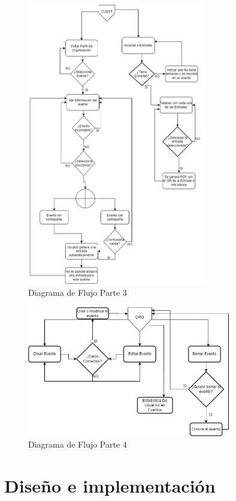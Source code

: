 \newpage
\begin{figure}[h]
    \centering
    \includegraphics[width=0.7\textwidth]{Cliente.png} 
    \caption{Diagrama de Flujo Parte 3}
    \label{fig:flujoEvs2}
\end{figure}
\newpage
\begin{figure}[h]
    \centering
    \includegraphics[width=0.8\textwidth]{Org.png} 
    \caption{Diagrama de Flujo Parte 4}
    \label{fig:flujoEvs3}
\end{figure}
\section{Diseño e implementación}    

